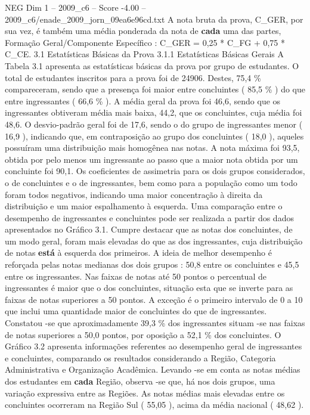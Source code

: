 \begin{textsample}{NEG Dim 1 – 2009\_c6 – Score -4.00 – 2009\_c6/enade\_2009\_jorn\_09ea6e96cd.txt}
A nota bruta da prova, C\_GER, por sua vez, é também uma média ponderada da nota de \textbf{cada} uma das partes, Formação Geral/Componente Específico : C\_GER = 0,25 * C\_FG + 0,75 * C\_CE. 3.1 Estatísticas Básicas da Prova 3.1.1 Estatísticas Básicas Gerais A Tabela 3.1 apresenta as estatísticas básicas da prova por grupo de estudantes.
O total de estudantes inscritos para a prova foi de 24906.
Destes, 75,4 \% compareceram, sendo que a presença foi maior entre concluintes ( 85,5 \% ) do que entre ingressantes ( 66,6 \% ).
A média geral da prova foi 46,6, sendo que os ingressantes obtiveram média mais baixa, 44,2, que os concluintes, cuja média foi 48,6.
O desvio-padrão geral foi de 17,6, sendo o do grupo de ingressantes menor ( 16,9 ), indicando que, em contraposição ao grupo dos concluintes ( 18,0 ), aqueles possuíram uma distribuição mais homogênea nas notas.
A nota máxima foi 93,5, obtida por pelo menos um ingressante ao passo que a maior nota obtida por um concluinte foi 90,1.
Os coeficientes de assimetria para os dois grupos considerados, o de concluintes e o de ingressantes, bem como para a população como um todo foram todos negativos, indicando uma maior concentração à direita da distribuição e um maior espalhamento à esquerda.
Uma comparação entre o desempenho de ingressantes e concluintes pode ser realizada a partir dos dados apresentados no Gráfico 3.1.
Cumpre destacar que as notas dos concluintes, de um modo geral, foram mais elevadas do que as dos ingressantes, cuja distribuição de notas \textbf{está} à esquerda dos primeiros.
A ideia de melhor desempenho é reforçada pelas notas medianas dos dois grupos : 50,8 entre os concluintes e 45,5 entre os ingressantes.
Nas faixas de notas até 50 pontos o percentual de ingressantes é maior que o dos concluintes, situação esta que se inverte para as faixas de notas superiores a 50 pontos.
A exceção é o primeiro intervalo de 0 a 10 que inclui uma quantidade maior de concluintes do que de ingressantes.
Constatou -se que aproximadamente 39,3 \% dos ingressantes situam -se nas faixas de notas superiores a 50,0 pontos, por oposição a 52,1 \% dos concluintes.
O Gráfico 3.2 apresenta informações referentes ao desempenho geral de ingressantes e concluintes, comparando os resultados considerando a Região, Categoria Administrativa e Organização Acadêmica.
Levando -se em conta as notas médias dos estudantes em \textbf{cada} Região, observa -se que, há nos dois grupos, uma variação expressiva entre as Regiões.
As notas médias mais elevadas entre os concluintes ocorreram na Região Sul ( 55,05 ), acima da média nacional ( 48,62 ).

\end{textsample}
